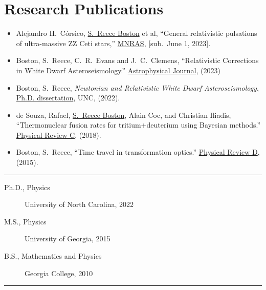 \documentclass[11pt, letter]{article}
\begin{document}
\section*{Research Publications}
\begin{minipage}{\textwidth}
%
\begin{itemize}
		\item Alejandro H.~C\'orsico, \underline{S.~Reece Boston} et al, 
			``General relativistic pulsations of ultra-massive ZZ Ceti stars,'' 
			\href{}{MNRAS}, 
			[sub.~June 1, 2023].
		\item Boston, S.~Reece, C.~R.~Evans and J.~C.~Clemens, 
			``Relativistic Corrections in White Dwarf Asteroseismology.'' 
			\href{https://iopscience.iop.org/article/10.3847/1538-4357/acd446}{Astrophysical Journal}, (2023)
		\item Boston, S.~Reece, 
			\emph{Newtonian and Relativistic White Dwarf Asteroseismology}, 
			\\\href{https://cdr.lib.unc.edu/concern/dissertations/jw827n44n?locale=en}{Ph.D. dissertation}, 
			UNC, (2022).
		\item de Souza, Rafael, \underline{S.~Reece Boston}, Alain Coc, and Christian Iliadis, 
			``Thermonuclear fusion rates for tritium+deuterium using Bayesian methods.''  
			\href{http://journals.aps.org/prc/abstract/10.1103/PhysRevC.99.014619}{Physical Review C}, 
			(2018).
		\item Boston, S.~Reece, 
			``Time travel in transformation optics.''  
			\href{http://journals.aps.org/prd/abstract/10.1103/PhysRevD.91.124035}{Physical Review D}, 
			(2015).
\end{itemize}

\hrule
\end{minipage}
\begin{description}
		\item[Ph.D., Physics] University of North Carolina, 2022
		\item[M.S., Physics] University of Georgia, 2015
		\item[B.S., Mathematics and Physics] Georgia College, 2010
\end{description}
\hrule

\vfill
\mbox{}
\end{document}
